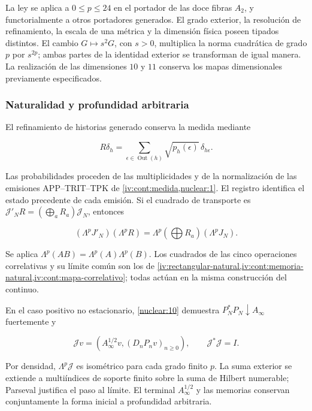 La ley se aplica a \(0\le p\le24\) en el portador de las doce
fibras \(A_2\), y functorialmente a otros portadores generados.
El grado exterior, la resolución de refinamiento, la escala de
una métrica y la dimensión física poseen tipados distintos.
El cambio \(G\mapsto s^2G\), con \(s>0\), multiplica la norma
cuadrática de grado \(p\) por \(s^{2p}\); ambas partes de la
identidad exterior se transforman de igual manera.
La realización de las dimensiones \(10\) y \(11\) conserva los
mapas dimensionales previamente especificados.

\subsubsection{Naturalidad y profundidad arbitraria}

El refinamiento de historias generado conserva la medida mediante



\[
R\delta_h=\sum_{\epsilon\in\operatorname{Out}(h)}
\sqrt{p_h(\epsilon)}\,\delta_{h\epsilon}.
\]



Las probabilidades proceden de las multiplicidades y de la
normalización de las emisiones APP--TRIT--TPK de
\cref{iv:cont:medida,nuclear:1}.
El registro identifica el estado precedente de cada emisión.
Si el cuadrado de transporte es
\(\mathcal J'_NR=(\bigoplus_aR_a)\mathcal J_N\), entonces



\begin{equation}
(\Lambda^pJ'_N)(\Lambda^pR)
=\Lambda^p(\bigoplus R_a)(\Lambda^pJ_N).
\label{nuc11:eq:23}
\end{equation}



Se aplica
\(\Lambda^p(AB)=\Lambda^p(A)\Lambda^p(B)\).
Los cuadrados de las cinco operaciones correlativas y su límite
común son los de
\cref{iv:rectangular-natural,iv:cont:memoria-natural,iv:cont:mapa-correlativo}; todas actúan en la misma construcción
del continuo.

En el caso positivo no estacionario,
\cref{nuclear:10} demuestra
\(P_N^*P_N\downarrow A_\infty\) fuertemente y



\[
\mathcal Jv=(A_\infty^{1/2}v,(D_nP_nv)_{n\ge0}),
\qquad \mathcal J^*\mathcal J=I.
\]



Por densidad, \(\Lambda^p\mathcal J\) es isométrico para cada
grado finito \(p\).
La suma exterior se extiende a multiíndices de soporte finito
sobre la suma de Hilbert numerable; Parseval justifica el paso
al límite.
El terminal \(A_\infty^{1/2}\) y las memorias conservan
conjuntamente la forma inicial a profundidad arbitraria.

